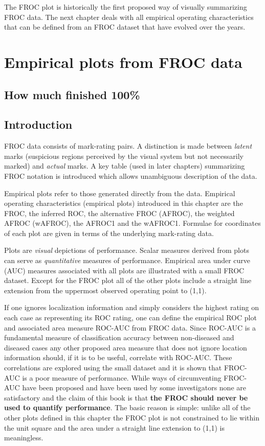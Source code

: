 \documentclass[
]{book}
\begin{document}
The FROC plot is historically the first proposed way of visually summarizing FROC data. The next chapter deals with all empirical operating characteristics that can be defined from an FROC dataset that have evolved over the years.

\hypertarget{empirical}{%
\chapter{Empirical plots from FROC data}\label{empirical}}

\hypertarget{empirical-how-much-finished}{%
\section{How much finished 100\%}\label{empirical-how-much-finished}}

\hypertarget{empirical-intro}{%
\section{Introduction}\label{empirical-intro}}

FROC data consists of mark-rating pairs. A distinction is made between \emph{latent} marks (suspicious regions perceived by the visual system but not necessarily marked) and \emph{actual} marks. A key table (used in later chapters) summarizing FROC notation is introduced which allows unambiguous description of the data.

Empirical plots refer to those generated directly from the data. Empirical operating characteristics (empirical plots) introduced in this chapter are the FROC, the inferred ROC, the alternative FROC (AFROC), the weighted AFROC (wAFROC), the AFROC1 and the wAFROC1. Formulae for coordinates of each plot are given in terms of the underlying mark-rating data.

Plots are \emph{visual} depictions of performance. Scalar measures derived from plots can serve as \emph{quantitative} measures of performance. Empirical area under curve (AUC) measures associated with all plots are illustrated with a small FROC dataset. Except for the FROC plot all of the other plots include a straight line extension from the uppermost observed operating point to (1,1).

If one ignores localization information and simply considers the highest rating on each case as representing its ROC rating, one can define the empirical ROC plot and associated area measure ROC-AUC from FROC data. Since ROC-AUC is a fundamental measure of classification accuracy between non-diseased and diseased cases any other proposed area measure that does not ignore location information should, if it is to be useful, correlate with ROC-AUC. These correlations are explored using the small dataset and it is shown that FROC-AUC is a poor measure of performance. While ways of circumventing FROC-AUC have been proposed and have been used by some investigators none are satisfactory and the claim of this book is that \textbf{the FROC should never be used to quantify performance}. The basic reason is simple: unlike all of the other plots defined in this chapter the FROC plot is not constrained to lie within the unit square and the area under a straight line extension to (1,1) is meaningless.
\end{document}
